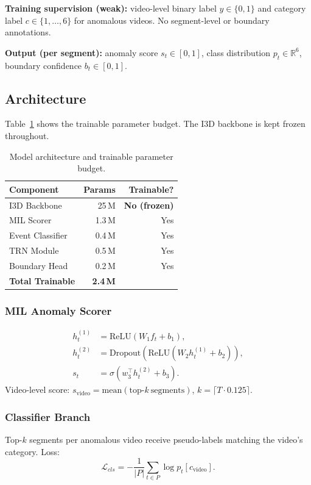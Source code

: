 \documentclass[11pt]{article}
\begin{document}
\textbf{Training supervision (weak):} video-level binary label $y \in \{0,1\}$
and category label $c \in \{1,\ldots,6\}$ for anomalous videos.
No segment-level or boundary annotations.

\textbf{Output (per segment):} anomaly score $s_t \in [0,1]$,
class distribution $p_t \in \mathbb{R}^6$,
boundary confidence $b_t \in [0,1]$.

\subsection{Architecture}

Table~\ref{tab:params} shows the trainable parameter budget.
The I3D backbone is kept frozen throughout.

\begin{table}[h]
\centering
\small
\begin{tabular}{lrr}
\toprule
\textbf{Component} & \textbf{Params} & \textbf{Trainable?} \\
\midrule
I3D Backbone     & 25\,M   & \textbf{No (frozen)} \\
MIL Scorer       &  1.3\,M & Yes \\
Event Classifier &  0.4\,M & Yes \\
TRN Module       &  0.5\,M & Yes \\
Boundary Head    &  0.2\,M & Yes \\
\midrule
\textbf{Total Trainable} & \textbf{2.4\,M} & \\
\bottomrule
\end{tabular}
\caption{Model architecture and trainable parameter budget.}
\label{tab:params}
\end{table}

\subsubsection{MIL Anomaly Scorer}
\begin{align}
h^{(1)}_t &= \mathrm{ReLU}(W_1 f_t + b_1), \\
h^{(2)}_t &= \mathrm{Dropout}(\mathrm{ReLU}(W_2 h^{(1)}_t + b_2)), \\
s_t       &= \sigma(w_3^\top h^{(2)}_t + b_3).
\end{align}
Video-level score:
$s_\mathrm{video} = \mathrm{mean}(\mathrm{top}\text{-}k\ \mathrm{segments})$,
$k = \lceil T \cdot 0.125 \rceil$.

\subsubsection{Classifier Branch}
Top-$k$ segments per anomalous video receive pseudo-labels matching the video's
category. Loss:
\begin{equation}
\mathcal{L}_{cls} = -\frac{1}{|P|} \sum_{t \in P} \log p_t[c_\mathrm{video}].
\end{equation}
\end{document}
